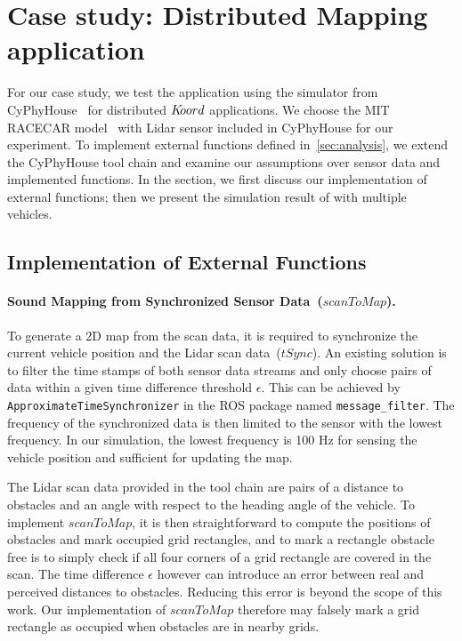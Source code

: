 \newcommand{\Koord}{\ensuremath{\lgname}\xspace}
\newcommand{\CyPhyHouse}{CyPhyHouse\xspace}
\newcommand{\Gazebo}{Gazebo\xspace}

\newcommand{\ScanToMap}{\ensuremath{\mathit{scanToMap}}\xspace}
\newcommand{\TSync}{\ensuremath{\mathit{tSync}}\xspace}
\newcommand{\PathToFrontier}{\ensuremath{\mathit{pickPathToFrontier}}\xspace}

\section{Case study: Distributed Mapping application}
\label{sec:experiments}

For our case study, we test the \dmap application using the simulator from \CyPhyHouse~\cite{ghosh2019cyphyhouse} for distributed \Koord applications.
We choose the MIT RACECAR model~\cite{MIT_RACECAR} with Lidar sensor included in \CyPhyHouse for our experiment.
To implement external functions defined in~\ref{sec:analysis},
we extend the \CyPhyHouse tool chain and examine our assumptions over sensor data and implemented functions.
In the section, we first discuss our implementation of external functions;
then we present the simulation result of \dmap with multiple vehicles.


\subsection{Implementation of External Functions}

\paragraph{Sound Mapping from Synchronized Sensor Data~(\ScanToMap).}
To generate a 2D map from the scan data,
it is required to synchronize the current vehicle position and the Lidar scan data~(\TSync).
An existing solution is to filter the time stamps of both sensor data streams
and only choose pairs of data within a given time difference threshold $\epsilon$.
This can be achieved by \texttt{ApproximateTimeSynchronizer} in the ROS package named \texttt{message\_filter}.
The frequency of the synchronized data is then limited to the sensor with the lowest frequency.
In our simulation, the lowest frequency is 100 Hz for sensing the vehicle position and sufficient for updating the map.

The Lidar scan data provided in the tool chain are pairs of a distance to obstacles and an angle with respect to the heading angle of the vehicle.
To implement \ScanToMap, it is then straightforward to compute the positions of obstacles and mark occupied grid rectangles,
and to mark a rectangle obstacle free is to simply check if all four corners of a grid rectangle are covered in the scan.
The time difference $\epsilon$ however can introduce an error between real and perceived distances to obstacles.
Reducing this error is beyond the scope of this work.
Our implementation of \ScanToMap therefore may falsely mark a grid rectangle as occupied when obstacles are in nearby grids.

